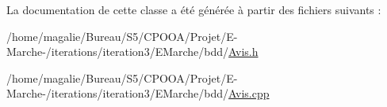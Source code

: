 La documentation de cette classe a été générée à partir des fichiers suivants \-:\begin{DoxyCompactItemize}
\item 
/home/magalie/\-Bureau/\-S5/\-C\-P\-O\-O\-A/\-Projet/\-E-\/\-Marche-\//iterations/iteration3/\-E\-Marche/bdd/\hyperlink{_avis_8h}{Avis.\-h}\item 
/home/magalie/\-Bureau/\-S5/\-C\-P\-O\-O\-A/\-Projet/\-E-\/\-Marche-\//iterations/iteration3/\-E\-Marche/bdd/\hyperlink{_avis_8cpp}{Avis.\-cpp}\end{DoxyCompactItemize}
